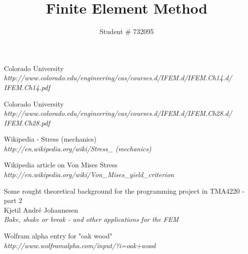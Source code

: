\documentclass[9pt]{extarticle}
\title{Finite Element Method}
\author{Student \# 732095 }
\begin{document}
\maketitle

































\begin{thebibliography}{3}

	Colorado University\\
	\emph{http://www.colorado.edu/engineering/cas/courses.d/IFEM.d/IFEM.Ch14.d/\\IFEM.Ch14.pdf}


	Colorado University\\
	\emph{http://www.colorado.edu/engineering/cas/courses.d/IFEM.d/IFEM.Ch28.d/\\IFEM.Ch28.pdf}	



Wikipedia - Stress (mechanics) \\
\emph{http://en.wikipedia.org/wiki/Stress\_ (mechanics)}

Wikipedia article on Von Mises Stress \\
\emph{http://en.wikipedia.org/wiki/Von\_Mises\_yield\_criterion}

Some rought theoretical background for the programming project in TMA4220 - part 2 \\
Kjetil André Johannesen \\
\emph{Bake, shake or break - and other applications for the FEM}

	Wolfram alpha entry for "oak wood"\\
	\emph{http://www.wolframalpha.com/input/?i=oak+wood}
	



\end{thebibliography}
\end{document}
